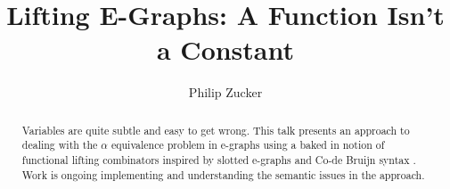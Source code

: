 \documentclass{article}%
\begin{document}
\title{Lifting E-Graphs: A Function Isn't a Constant}
% 
% 
% 

\author{Philip Zucker}

\maketitle
\begin{abstract}
Variables are quite subtle and easy to get wrong. This talk presents an approach to dealing with the $\alpha$ equivalence problem in e-graphs using a baked in notion of functional lifting combinators inspired by slotted e-graphs \cite{slotted} and Co-de Bruijn syntax \cite{McBride_2018}. Work is ongoing implementing \cite{zucker2026microeggpythin} and understanding the semantic issues in the approach.
\end{abstract}






\end{document}
